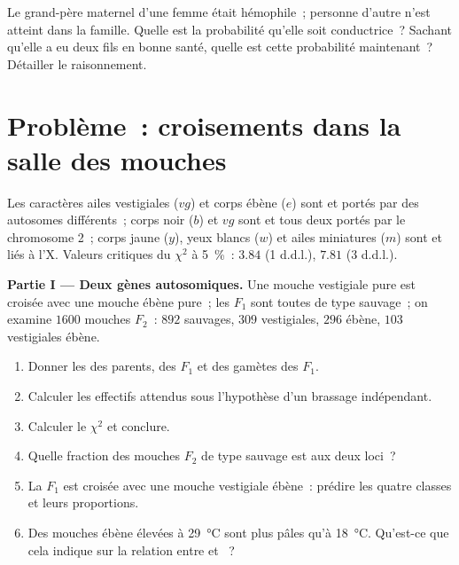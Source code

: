 \begin{exercise}[$\star\star\star$]\label{exo:b2:meiosis-heredity:12}
Le grand-père maternel d'une femme était hémophile~; personne d'autre
n'est atteint dans la famille. Quelle est la probabilité qu'elle soit
conductrice~? Sachant qu'elle a eu deux fils en bonne santé, quelle est
cette probabilité maintenant~? Détailler le raisonnement.
\end{exercise}

\section{Problème~: croisements dans la salle des mouches}

\begin{problem}
\label{pb:b2:meiosis-heredity:1}
Les caractères ailes vestigiales ($vg$) et corps ébène ($e$) sont
 et portés par des autosomes différents~; corps noir ($b$) et
$vg$ sont  et tous deux portés par le chromosome 2~; corps
jaune ($y$), yeux blancs ($w$) et ailes miniatures
($m$) sont  et liés à l'X. Valeurs critiques du $\chi^2$ à
\qty{5}{\%}~: $3.84$ (1 d.d.l.), $7.81$ (3 d.d.l.).

\medskip
\noindent\textbf{Partie I --- Deux gènes autosomiques.}
Une mouche vestigiale pure est croisée avec une mouche ébène pure~; les
$F_1$ sont toutes de type sauvage~; on examine $1600$ mouches $F_2$~:
$892$ sauvages, $309$
vestigiales, $296$ ébène, $103$ vestigiales ébène.
\begin{enumerate}
  \item Donner les  des parents, des $F_1$ et des gamètes
        des $F_1$.
  \item Calculer les effectifs attendus sous l'hypothèse d'un brassage
        indépendant.
  \item Calculer le $\chi^2$ et conclure.
  \item Quelle fraction des mouches $F_2$ de type sauvage est 
        aux deux loci~?
  \item La $F_1$ est croisée avec une mouche vestigiale ébène~: prédire
        les quatre classes et leurs proportions.
  \item Des mouches ébène élevées à \qty{29}{\celsius} sont plus pâles
        qu'à \qty{18}{\celsius}. Qu'est-ce que cela indique sur la
        relation entre  et ~?
\end{enumerate}


\end{problem}
